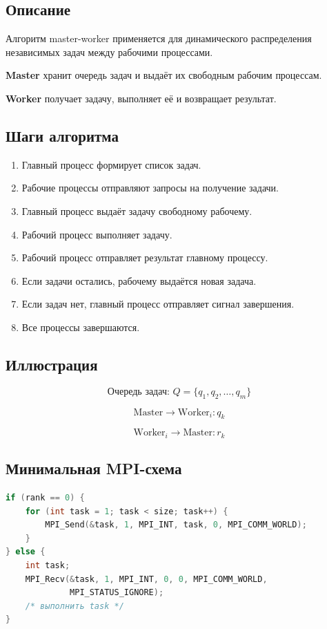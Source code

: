 \documentclass[12pt,a4paper]{article}
\begin{document}
\subsection{Описание}

Алгоритм master-worker применяется для динамического распределения независимых задач между рабочими процессами.

\textbf{Master} хранит очередь задач и выдаёт их свободным рабочим процессам.

\textbf{Worker} получает задачу, выполняет её и возвращает результат.

\subsection{Шаги алгоритма}

\begin{enumerate}
    \item Главный процесс формирует список задач.
    \item Рабочие процессы отправляют запросы на получение задачи.
    \item Главный процесс выдаёт задачу свободному рабочему.
    \item Рабочий процесс выполняет задачу.
    \item Рабочий процесс отправляет результат главному процессу.
    \item Если задачи остались, рабочему выдаётся новая задача.
    \item Если задач нет, главный процесс отправляет сигнал завершения.
    \item Все процессы завершаются.
\end{enumerate}

\subsection{Иллюстрация}

\[
\text{Очередь задач: } Q = \{q_1,q_2,\ldots,q_m\}
\]

\[
\text{Master} \rightarrow \text{Worker}_i : q_k
\]

\[
\text{Worker}_i \rightarrow \text{Master} : r_k
\]

\subsection{Минимальная MPI-схема}

\begin{lstlisting}[language=C]
if (rank == 0) {
    for (int task = 1; task < size; task++) {
        MPI_Send(&task, 1, MPI_INT, task, 0, MPI_COMM_WORLD);
    }
} else {
    int task;
    MPI_Recv(&task, 1, MPI_INT, 0, 0, MPI_COMM_WORLD,
             MPI_STATUS_IGNORE);
    /* выполнить task */
}
\end{lstlisting}
\end{document}

